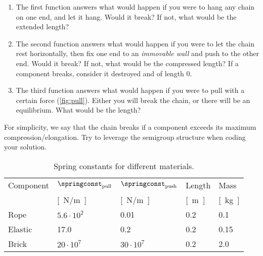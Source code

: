 \begin{gradedexercise}
\begin{enumerate}
        \begin{enumerate}
            \item The first function answers what would happen if you were to hang any chain on one end, and let it hang.
            Would it break?
            If not, what would be the extended length?
            \item The second function answers what would happen if you were to let the chain rest horizontally, then fix one end to an \emph{immovable wall} and push to the other end.
            Would it break?
            If not, what would be the compressed length?
            If a component breaks, consider it destroyed and of length 0.
            \item The third function answers what would happen if you were to pull with a certain force (\cref{fig:pull}).
            Either you will break the chain, or there will be an equilibrium.
            What would be the length?
        \end{enumerate}

        \begin{hint}
            For simplicity, we say that the chain breaks if a component exceeds its maximum compression/elongation.
            Try to leverage the semigroup structure when coding your solution.
        \end{hint}
    \end{enumerate}
\end{gradedexercise}



\begin{table}
    \centering
    \footnotesize
    \begin{tabular}{lllll}
        Component & $\springconst_\mathrm{pull}$ & $\springconst_\mathrm{push}$ & Length       & Mass          \\
        & \unit[]{[N/m]}               & \unit[]{[N/m]}               & \unit[]{[m]} & \unit[]{[kg]} \\
        \toprule
        Rope      & $5.6\cdot 10^2$              & 0.01                         & 0.2          & 0.1           \\
        Elastic   & 17.0                         & 0.2                          & 0.2          & 0.15          \\
        Brick     & $20\cdot 10^7$               & $30\cdot 10^7$               & 0.2          & 2.0           \\
    \end{tabular}
    \caption{Spring constants for different materials.
    }
    \label{tab:spring_const}
\end{table}

